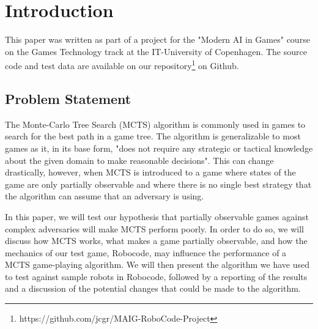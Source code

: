 \section{Introduction}
\label{01}
This paper was written as part of a project for the "Modern AI in Games" course on the Games Technology track at the IT-University of Copenhagen. The source code and test data are available on our repository\footnote{https://github.com/jcgr/MAIG-RoboCode-Project} on Github.

\subsection{Problem Statement}

The Monte-Carlo Tree Search (MCTS) algorithm is commonly used in games to search for the best path in a game tree. The algorithm is generalizable to most games as it, in its base form, "does not require any strategic or tactical knowledge about the given domain to make reasonable decisions"\cite{mctsai}. This can change drastically, however, when MCTS is introduced to a game where states of the game are only partially observable and where there is no single best strategy that the algorithm can assume that an adversary is using. 

In this paper, we will test our hypothesis that partially observable games against complex adversaries will make MCTS perform poorly. In order to do so, we will discuss how MCTS works, what makes a game partially observable, and how the mechanics of our test game, Robocode, may influence the performance of a MCTS game-playing algorithm. We will then present the algorithm we have used to test against sample robots in Robocode, followed by a reporting of the results and a discussion of the potential changes that could be made to the algorithm.